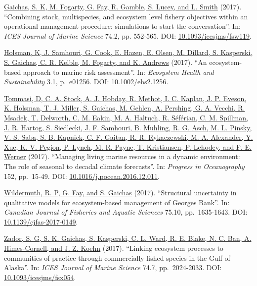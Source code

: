 \documentclass[11pt, a4paper]{awesome-cv}
\begin{document}
\protect\hyperlink{cite-gaichas_combining_2017}{Gaichas, S. K, M. Fogarty, G.
Fay, R. Gamble, S. Lucey, and L. Smith}
(2017). ``Combining stock, multispecies, and ecosystem level fishery
objectives within an operational management procedure: simulations to
start the conversation''. In: \emph{ICES Journal of Marine Science} 74.2, pp.
552-565. DOI:
\href{https://doi.org/10.1093\%2Ficesjms\%2Ffsw119}{10.1093/icesjms/fsw119}.

\protect\hyperlink{cite-holsman_ecosystem-based_2017}{Holsman, K, J. Samhouri,
G. Cook, E. Hazen, E. Olsen, M. Dillard, S. Kasperski, S. Gaichas, C.
R. Kelble, M. Fogarty, and K.
Andrews} (2017). ``An
ecosystem-based approach to marine risk assessment''. In: \emph{Ecosystem
Health and Sustainability} 3.1, p.~e01256. DOI:
\href{https://doi.org/10.1002\%2Fehs2.1256}{10.1002/ehs2.1256}.

\protect\hyperlink{cite-tommasi_managing_2017}{Tommasi, D, C. A. Stock, A. J.
Hobday, R. Methot, I. C. Kaplan, J. P. Eveson, K. Holsman, T. J.
Miller, S. Gaichas, M. Gehlen, A. Pershing, G. A. Vecchi, R. Msadek, T.
Delworth, C. M. Eakin, M. A. Haltuch, R. Séférian, C. M. Spillman, J.
R. Hartog, S. Siedlecki, J. F. Samhouri, B. Muhling, R. G. Asch, M. L.
Pinsky, V. S. Saba, S. B. Kapnick, C. F. Gaitan, R. R. Rykaczewski, M.
A. Alexander, Y. Xue, K. V. Pegion, P. Lynch, M. R. Payne, T.
Kristiansen, P. Lehodey, and F. E. Werner}
(2017). ``Managing living marine resources in a dynamic environment: The
role of seasonal to decadal climate forecasts''. In: \emph{Progress in
Oceanography} 152, pp.~15-49. DOI:
\href{https://doi.org/10.1016\%2Fj.pocean.2016.12.011}{10.1016/j.pocean.2016.12.011}.

\protect\hyperlink{cite-wildermuth_structural_2017}{Wildermuth, R. P, G. Fay,
and S. Gaichas} (2017). ``Structural
uncertainty in qualitative models for ecosystem-based management of
Georges Bank''. In: \emph{Canadian Journal of Fisheries and Aquatic Sciences}
75.10, pp.~1635-1643. DOI:
\href{https://doi.org/10.1139\%2Fcjfas-2017-0149}{10.1139/cjfas-2017-0149}.

\protect\hyperlink{cite-zador_linking_2017}{Zador, S. G, S. K. Gaichas, S.
Kasperski, C. L. Ward, R. E. Blake, N. C. Ban, A. Himes-Cornell, and J.
Z. Koehn} (2017). ``Linking ecosystem
processes to communities of practice through commercially fished
species in the Gulf of Alaska''. In: \emph{ICES Journal of Marine Science}
74.7, pp.~2024-2033. DOI:
\href{https://doi.org/10.1093\%2Ficesjms\%2Ffsx054}{10.1093/icesjms/fsx054}.
\end{document}
